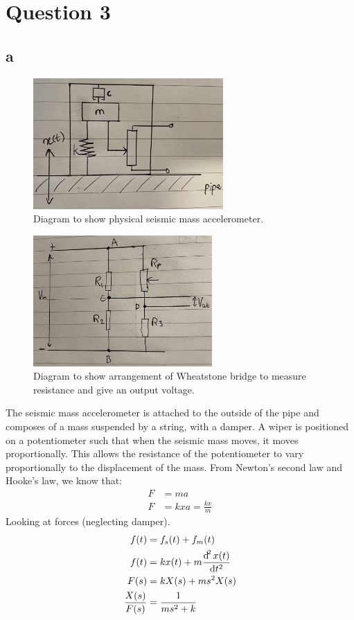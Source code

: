 \documentclass[11pt]{article}
\numberwithin{equation}{section}
\begin{document}
\section{Question 3}
\subsection{a}
\begin{figure}[H]
    \centering
    \includegraphics[height = 5cm]{./img/q3i1.jpg}
    \caption{Diagram to show physical seismic mass accelerometer.} 
    \label{fig:q3i1}
\end{figure}
\begin{figure}[H]
    \centering
    \includegraphics[height = 5cm]{./img/q3i2.jpg}
    \caption{Diagram to show arrangement of Wheatstone bridge to measure resistance and give an output voltage.} 
    \label{fig:q3i2}
\end{figure}
The seismic mass accelerometer is attached to the outside of the pipe and composes of a mass suspended by a string, with a damper. A wiper is positioned on a potentiometer such that when the seismic mass moves, it moves proportionally. This allows the resistance of the potentiometer to vary proportionally to the displacement of the mass. From Newton's second law and Hooke's law, we know that:
\begin{align}
    F &= ma\\
    F &= kx
    a = \frac{kx}{m}
\end{align}
Looking at forces (neglecting damper).
\begin{align}
    f(t) &= f_s(t) + f_m(t)\\
    f(t) &= kx(t) + m\frac{\dif^2 x(t)}{\dif t^2}\\
    F(s) &= kX(s) + ms^2 X(s)\\
    \frac{X(s)}{F(s)} &= \frac{1}{ms^2 + k}
\end{align}
\end{document}
